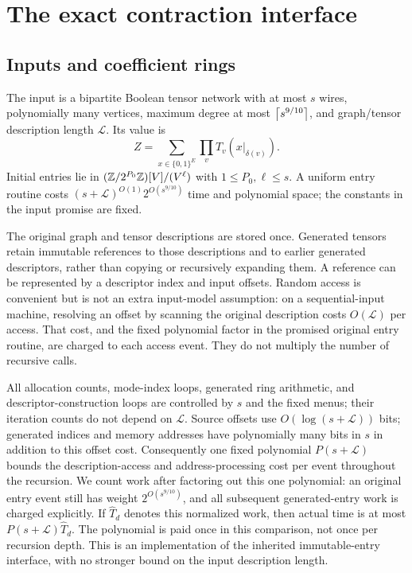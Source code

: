 \section{The exact contraction interface}
\label{sec:interface}

\subsection{Inputs and coefficient rings}

The input is a bipartite Boolean tensor network with at most $s$ wires,
polynomially many vertices, maximum degree at most $\left\lceil s^{9/10}\right\rceil$,
and graph/tensor description length $\mathcal L$. Its value is
\[
 Z=\sum_{x\in\{0,1\}^{E}}\prod_v T_v(x|_{\delta(v)}).
\]
Initial entries lie in
$(\mathbb Z/2^{P_0}\mathbb Z)[V]/(V^\ell)$ with $1\le P_0,\ell\le s$.
A uniform entry routine costs
$(s+\mathcal L)^{O(1)}2^{O(s^{9/10})}$ time and polynomial space;
the constants in the input promise are fixed.

The original graph and tensor descriptions are stored once. Generated
tensors retain immutable references to those descriptions and to earlier
generated descriptors, rather than copying or recursively expanding them.
A reference can be represented by a descriptor index and input offsets.
Random access is convenient but is not an extra input-model assumption:
on a sequential-input machine, resolving an offset by scanning the original
description costs $O(\mathcal L)$ per access. That cost, and the fixed
polynomial factor in the promised original entry routine, are charged to
each access event. They do not multiply the number of recursive calls.

All allocation counts, mode-index loops, generated ring arithmetic, and
descriptor-construction loops are controlled by $s$ and the fixed menus;
their iteration counts do not depend on $\mathcal L$. Source offsets use
$O(\log(s+\mathcal L))$ bits; generated indices and memory addresses
have polynomially many bits in $s$ in addition to this offset cost.
Consequently one fixed polynomial
$P(s+\mathcal L)$ bounds the description-access and address-processing
cost per event throughout the recursion. We count work after factoring
out this one polynomial: an original entry event still has weight
$2^{O(s^{9/10})}$, and all subsequent generated-entry work is charged
explicitly. If $\widehat T_d$ denotes this normalized work, then actual
time is at most $P(s+\mathcal L)\widehat T_d$. The polynomial is paid
once in this comparison, not once per recursion depth. This is an
implementation of the inherited immutable-entry interface, with no
stronger bound on the input description length.

